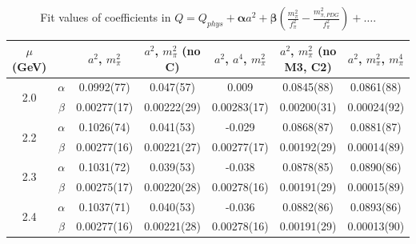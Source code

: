 \documentclass[12pt]{extarticle}
\begin{document}
\begin{table}[h!]
\begin{center}
\begin{tabular}{|c c|c|c|c|c|c|}
\hline
$\mu$ (GeV) &  & $a^2$, $m_\pi^2$& $a^2$, $m_\pi^2$ (no C)& $a^2$, $a^4$, $m_\pi^2$& $a^2$, $m_\pi^2$ (no M3, C2)& $a^2$, $m_\pi^2$, $m_\pi^4$\\
\hline
\multirow{2}{0.5in}{2.0} & $\alpha$ & 0.0992(77)& 0.047(57)& 0.009& 0.0845(88)& 0.0861(88)\\
 & $\beta$ & 0.00277(17)& 0.00222(29)& 0.00283(17)& 0.00200(31)& 0.00024(92)\\
\hline
\multirow{2}{0.5in}{2.2} & $\alpha$ & 0.1026(74)& 0.041(53)& -0.029& 0.0868(87)& 0.0881(87)\\
 & $\beta$ & 0.00277(16)& 0.00221(27)& 0.00277(17)& 0.00192(29)& 0.00014(89)\\
\hline
\multirow{2}{0.5in}{2.3} & $\alpha$ & 0.1031(72)& 0.039(53)& -0.038& 0.0878(85)& 0.0890(86)\\
 & $\beta$ & 0.00275(17)& 0.00220(28)& 0.00278(16)& 0.00191(29)& 0.00015(89)\\
\hline
\multirow{2}{0.5in}{2.4} & $\alpha$ & 0.1037(71)& 0.040(53)& -0.036& 0.0882(86)& 0.0893(86)\\
 & $\beta$ & 0.00277(16)& 0.00221(28)& 0.00278(16)& 0.00191(29)& 0.00013(90)\\
\hline
\end{tabular}
\caption{Fit values of coefficients in $Q = Q_{phys} + \mathbf{\alpha} a^2 + \mathbf{\beta}\left(\frac{m_\pi^2}{f_\pi^2}-\frac{m_{\pi,PDG}^2}{f_\pi^2}\right) + \ldots$.}
\end{center}
\end{table}




















\clearpage
\end{document}
